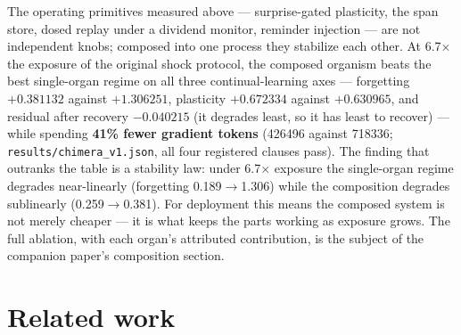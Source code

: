 \documentclass[11pt]{article}
\theoremstyle{definition}
\newcommand{\code}[1]{\texttt{#1}}
\begin{document}
The operating primitives measured above --- surprise-gated plasticity, the
span store, dosed replay under a dividend monitor, reminder injection --- are
not independent knobs; composed into one process they stabilize each other. At
6.7$\times$ the exposure of the original shock protocol, the composed organism
beats the best single-organ regime on all three continual-learning axes ---
forgetting \textbf{$+\num{0.381132}$} against $+\num{1.306251}$, plasticity
$+\num{0.672334}$ against $+\num{0.630965}$, and residual after recovery
$-\num{0.040215}$ (it degrades least, so it has least to recover) --- while
spending \textbf{41\% fewer gradient tokens} (\num{426496} against
\num{718336}; \code{results/chimera\_v1.json}, all four registered clauses
pass). The finding that outranks the table is a stability law: under
6.7$\times$ exposure the single-organ regime degrades near-linearly (forgetting
\num{0.189}$\to$\num{1.306}) while the composition degrades sublinearly
(\num{0.259}$\to$\num{0.381}). For deployment this means the composed system is
not merely cheaper --- it is what keeps the parts working as exposure grows.
The full ablation, with each organ's attributed contribution, is the subject of
the companion paper's composition section.

\section{Related work}
\label{sec:related}
\end{document}
